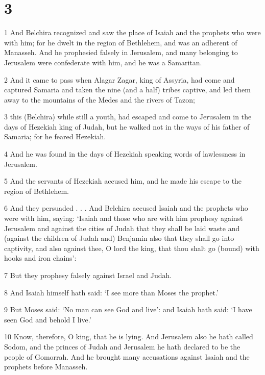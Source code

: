 \chapter{3}

\par 1 And Belchira recognized and saw the place of Isaiah and the prophets who were with him; for he dwelt in the region of Bethlehem, and was an adherent of Manasseh. And he prophesied falsely in Jerusalem, and many belonging to Jerusalem were confederate with him, and he was a Samaritan.

\par 2 And it came to pass when Alagar Zagar, king of Assyria, had come and captured Samaria and taken the nine (and a half) tribes captive, and led them away to the mountains of the Medes and the rivers of Tazon;

\par 3 this (Belchira) while still a youth, had escaped and come to Jerusalem in the days of Hezekiah king of Judah, but he walked not in the ways of his father of Samaria; for he feared Hezekiah.

\par 4 And he was found in the days of Hezekiah speaking words of lawlessness in Jerusalem.

\par 5 And the servants of Hezekiah accused him, and he made his escape to the region of Bethlehem.

\par 6 And they persuaded . . . And Belchira accused Isaiah and the prophets who were with him, saying: ‘Isaiah and those who are with him prophesy against Jerusalem and against the cities of Judah that they shall be laid waste and (against the children of Judah and) Benjamin also that they shall go into captivity, and also against thee, O lord the king, that thou shalt go (bound) with hooks and iron chains’:

\par 7 But they prophesy falsely against Israel and Judah.

\par 8 And Isaiah himself hath said: ‘I see more than Moses the prophet.’

\par 9 But Moses said: ‘No man can see God and live’: and Isaiah hath said: ‘I have seen God and behold I live.’

\par 10 Know, therefore, O king, that he is lying. And Jerusalem also he hath called Sodom, and the princes of Judah and Jerusalem he hath declared to be the people of Gomorrah. And he brought many accusations against Isaiah and the prophets before Manasseh.

